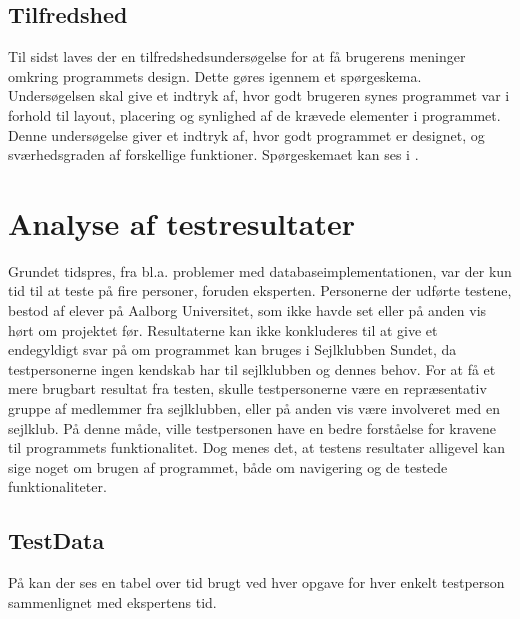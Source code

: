 \subsection{Tilfredshed}
Til sidst laves der en tilfredshedsundersøgelse for at få brugerens meninger omkring programmets design. 
Dette gøres igennem et spørgeskema. 
Undersøgelsen skal give et indtryk af, hvor godt brugeren synes programmet var i forhold til layout, placering og synlighed af de krævede elementer i programmet. 
Denne undersøgelse giver et indtryk af, hvor godt programmet er designet, og sværhedsgraden af forskellige funktioner. 
Spørgeskemaet kan ses i . \citep{UISatisfaction}


\section{Analyse af testresultater}

Grundet tidspres, fra bl.a. problemer med databaseimplementationen, var der kun tid til at teste på fire personer, foruden eksperten.
Personerne der udførte testene, bestod af elever på Aalborg Universitet, som ikke havde set eller på anden vis hørt om projektet før.
Resultaterne kan ikke konkluderes til at give et endegyldigt svar på om programmet kan bruges i Sejlklubben Sundet, da testpersonerne ingen kendskab har til sejlklubben og dennes behov. 
For at få et mere brugbart resultat fra testen, skulle testpersonerne være en repræsentativ gruppe af medlemmer fra sejlklubben, eller på anden vis være involveret med en sejlklub. 
På denne måde, ville testpersonen have en bedre forståelse for kravene til programmets funktionalitet.
Dog menes det, at testens resultater alligevel kan sige noget om brugen af programmet, både om navigering og de testede funktionaliteter.

\subsection{TestData}
På  kan der ses en tabel over tid brugt ved hver opgave for hver enkelt testperson sammenlignet med ekspertens tid.

